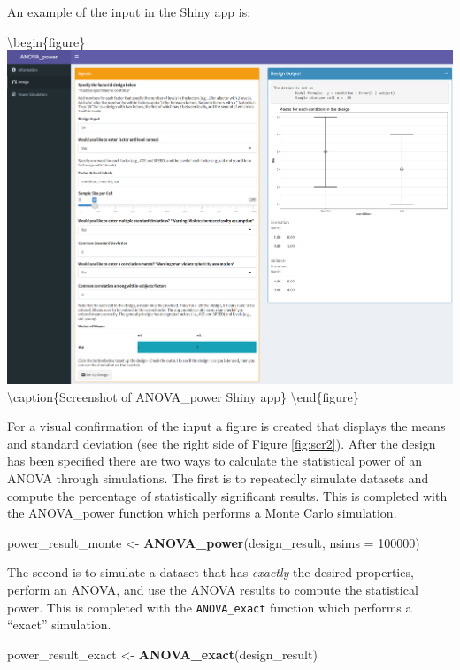 \documentclass[,man,floatsintext]{apa6}
\newenvironment{Shaded}{\begin{snugshade}}{\end{snugshade}}
\newcommand{\DataTypeTok}[1]{\textcolor[rgb]{0.13,0.29,0.53}{#1}}
\newcommand{\DecValTok}[1]{\textcolor[rgb]{0.00,0.00,0.81}{#1}}
\newcommand{\KeywordTok}[1]{\textcolor[rgb]{0.13,0.29,0.53}{\textbf{#1}}}
\newcommand{\NormalTok}[1]{#1}
\newcommand{\StringTok}[1]{\textcolor[rgb]{0.31,0.60,0.02}{#1}}
\begin{document}
An example of the input in the Shiny app is:

\textbackslash begin\{figure\}
\includegraphics[width=6.69in]{screenshots/anova_power} \textbackslash caption\{Screenshot of ANOVA\_power Shiny app\}\label{fig:scr2}
\textbackslash end\{figure\}

For a visual confirmation of the input a figure is created that displays the means and standard deviation (see the right side of Figure \ref{fig:scr2}).
After the design has been specified there are two ways to calculate the statistical power of an ANOVA through simulations.
The first is to repeatedly simulate datasets and compute the percentage of statistically significant results. This is completed with the ANOVA\_power function which performs a Monte Carlo simulation.

\begin{Shaded}
\begin{Highlighting}[]
\NormalTok{power_result_monte <-}\StringTok{ }\KeywordTok{ANOVA_power}\NormalTok{(design_result, }\DataTypeTok{nsims =} \DecValTok{100000}\NormalTok{)}
\end{Highlighting}
\end{Shaded}

The second is to simulate a dataset that has \emph{exactly} the desired properties, perform an ANOVA, and use the ANOVA results to compute the statistical power. This is completed with the \texttt{ANOVA\_exact} function which performs a \enquote{exact} simulation.

\begin{Shaded}
\begin{Highlighting}[]
\NormalTok{power_result_exact <-}\StringTok{ }\KeywordTok{ANOVA_exact}\NormalTok{(design_result)}
\end{Highlighting}
\end{Shaded}
\end{document}
